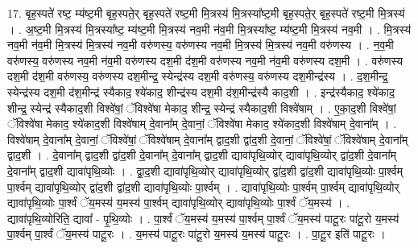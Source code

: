 \documentclass[17pt]{extarticle}
\begin{document}
17. बृह॒स्पते॑ रष्ट॒ म्य॑ष्ट॒मी बृह॒स्पते॒र् बृह॒स्पते॑ रष्ट॒मी मि॒त्रस्य॑ मि॒त्रस्या᳚ष्ट॒मी बृह॒स्पते॒र् बृह॒स्पते॑ रष्ट॒मी मि॒त्रस्य॑ । . अ॒ष्ट॒मी मि॒त्रस्य॑ मि॒त्रस्या᳚ष्ट॒ म्य॑ष्ट॒मी मि॒त्रस्य॑ नव॒मी न॑व॒मी मि॒त्रस्या᳚ष्ट॒ म्य॑ष्ट॒मी मि॒त्रस्य॑ नव॒मी । . मि॒त्रस्य॑ नव॒मी न॑व॒मी मि॒त्रस्य॑ मि॒त्रस्य॑ नव॒मी वरु॑णस्य॒ वरु॑णस्य नव॒मी मि॒त्रस्य॑ मि॒त्रस्य॑ नव॒मी वरु॑णस्य । . न॒व॒मी वरु॑णस्य॒ वरु॑णस्य नव॒मी न॑व॒मी वरु॑णस्य दश॒मी द॑श॒मी वरु॑णस्य नव॒मी न॑व॒मी वरु॑णस्य दश॒मी । . वरु॑णस्य दश॒मी द॑श॒मी वरु॑णस्य॒ वरु॑णस्य दश॒मीन्द्र॒ स्येन्द्र॑स्य दश॒मी वरु॑णस्य॒ वरु॑णस्य दश॒मीन्द्र॑स्य । . द॒श॒मीन्द्र॒ स्येन्द्र॑स्य दश॒मी द॑श॒मीन्द्र॑ स्यैकाद॒ श्ये॑काद॒ शीन्द्र॑स्य दश॒मी द॑श॒मीन्द्र॑स्यै काद॒शी । . इन्द्र॑स्यैकाद॒ श्ये॑काद॒ शीन्द्र॒ स्येन्द्र॑ स्यैकाद॒शी विश्वे॑षां॒ ॅविश्वे॑षा मेकाद॒ शीन्द्र॒ स्येन्द्र॑
स्यैकाद॒शी विश्वे॑षाम् । . ए॒का॒द॒शी विश्वे॑षां॒ ॅविश्वे॑षा मेकाद॒ श्ये॑काद॒शी विश्वे॑षाम् दे॒वाना᳚म् दे॒वानां॒ ॅविश्वे॑षा मेकाद॒ श्ये॑काद॒शी विश्वे॑षाम् दे॒वाना᳚म् । . विश्वे॑षाम् दे॒वाना᳚म् दे॒वानां॒ ॅविश्वे॑षां॒ ॅविश्वे॑षाम् दे॒वाना᳚म् द्वाद॒शी द्वा॑द॒शी दे॒वानां॒ ॅविश्वे॑षां॒ ॅविश्वे॑षाम् दे॒वाना᳚म् द्वाद॒शी । . दे॒वाना᳚म् द्वाद॒शी द्वा॑द॒शी दे॒वाना᳚म् दे॒वाना᳚म् द्वाद॒शी द्यावा॑पृथि॒व्योर् द्यावा॑पृथि॒व्योर् द्वा॑द॒शी दे॒वाना᳚म् दे॒वाना᳚म् द्वाद॒शी द्यावा॑पृथि॒व्योः । . द्वा॒द॒शी द्यावा॑पृथि॒व्योर् द्यावा॑पृथि॒व्योर् द्वा॑द॒शी द्वा॑द॒शी द्यावा॑पृथि॒व्योः पा॒र्श्वम् पा॒र्श्वम् द्यावा॑पृथि॒व्योर् द्वा॑द॒शी द्वा॑द॒शी द्यावा॑पृथि॒व्योः पा॒र्श्वम् । . द्यावा॑पृथि॒व्योः पा॒र्श्वम् पा॒र्श्वम् द्यावा॑पृथि॒व्योर् द्यावा॑पृथि॒व्योः पा॒र्श्वं ॅय॒मस्य॑ य॒मस्य॑ पा॒र्श्वम् द्यावा॑पृथि॒व्योर् द्यावा॑पृथि॒व्योः पा॒र्श्वं ॅय॒मस्य॑ । . द्यावा॑पृथि॒व्योरिति॒ द्यावा᳚ - पृ॒थि॒व्योः । . पा॒र्श्वं ॅय॒मस्य॑ य॒मस्य॑ पा॒र्श्वम् पा॒र्श्वं ॅय॒मस्य॑ पाटू॒रः पा॑टू॒रो य॒मस्य॑ पा॒र्श्वम् पा॒र्श्वं ॅय॒मस्य॑ पाटू॒रः । . य॒मस्य॑ पाटू॒रः पा॑टू॒रो य॒मस्य॑ य॒मस्य॑ पाटू॒रः । . पा॒टू॒र इति॑ पाटू॒रः । \newline
\pagebreak
{}
\end{document}
